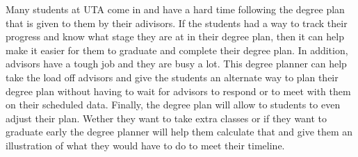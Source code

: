 Many students at UTA come in and have a hard time following the degree plan that is given to them by their adivisors. If the students had a way to track their progress and know what stage they are at in their degree plan, then it can help make it easier for them to graduate and complete their degree plan. In addition, advisors have a tough job and they are busy a lot. This degree planner can help take the load off advisors and give the students an alternate way to plan their degree plan without having to wait for advisors to respond or to meet with them on their scheduled data. Finally, the degree plan will allow to students to even adjust their plan. Wether they want to take extra classes or if they want to graduate early the degree planner will help them calculate that and give them an illustration of what they would have to do to meet their timeline. 
